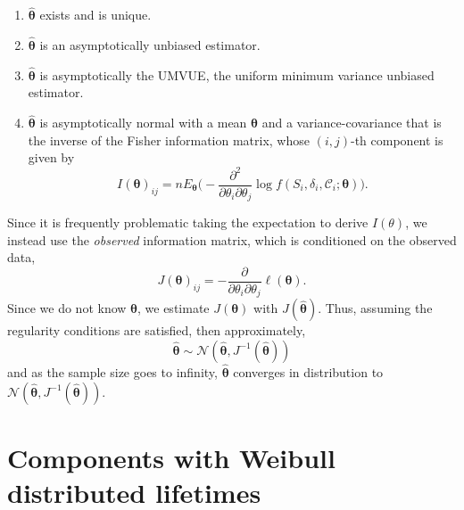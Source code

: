 \documentclass[
]{article}
\begin{document}
\begin{enumerate}
\def\labelenumi{\arabic{enumi}.}
\item
  \(\boldsymbol{\hat\theta}\) exists and is unique.
\item
  \(\boldsymbol{\hat\theta}\) is an asymptotically unbiased estimator.
\item
  \(\boldsymbol{\hat\theta}\) is asymptotically the UMVUE, the uniform
  minimum variance unbiased estimator.
\item
  \(\boldsymbol{\hat\theta}\) is asymptotically normal with a mean
  \(\boldsymbol{\theta}\) and a variance-covariance that is the inverse
  of the Fisher information matrix, whose \((i,j)\)-th component is
  given by \[
   I(\boldsymbol{\theta})_{i j} = n E_{\boldsymbol{\theta}}\biggl(-\frac{\partial^2}{\partial \theta_i \partial \theta_j}
       \log f(S_i,\delta_i,\mathcal{C}_i;\boldsymbol{\theta})\biggr).
  \]
\end{enumerate}

Since it is frequently problematic taking the expectation to derive
\(I(\theta)\), we instead use the \emph{observed} information matrix,
which is conditioned on the observed data, \[
J(\boldsymbol{\theta})_{i j} = -\frac{\partial}{\partial \theta_i \partial \theta_j}
    \ell(\boldsymbol{\theta}).
\] Since we do not know \(\boldsymbol{\theta}\), we estimate
\(J(\boldsymbol{\theta})\) with \(J(\boldsymbol{\hat\theta})\). Thus,
assuming the regularity conditions are satisfied, then approximately, \[
    \hat{\boldsymbol{\theta}} \sim \mathcal{N}(\hat{\boldsymbol{\theta}},J^{-1}(\hat{\boldsymbol{\theta}}))
\] and as the sample size goes to infinity,
\(\hat{\boldsymbol{\theta}}\) converges in distribution to
\(\mathcal{N}(\hat{\boldsymbol{\theta}},J^{-1}(\hat{\boldsymbol{\theta}}))\).

\hypertarget{sec:weibull}{%
\section{Components with Weibull distributed
lifetimes}\label{sec:weibull}}
\end{document}
